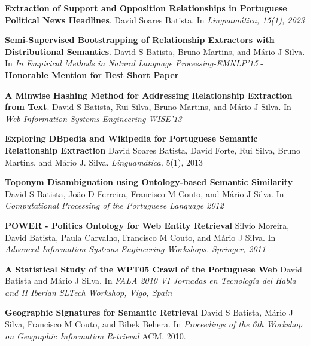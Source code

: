 
\vspace{-5.5mm}

\begin{cventries}

  \cventry
    {} %
    {} %
    {} %
    {} %
    {
      \begin{cvitems} %
        \item {\bf Extraction of Support and Opposition Relationships in Portuguese Political News Headlines}. David Soares Batista. In {\it Linguamática, 15(1), 2023}
		\vspace{2.0mm}
        \item {{\bf Semi-Supervised Bootstrapping of Relationship Extractors with Distributional Semantics}. David S Batista, Bruno Martins, and Mário J Silva. In {\it In Empirical Methods in Natural Language Processing-EMNLP'15} - {\bf Honorable Mention for Best Short Paper}}
		\vspace{2.0mm}
		\item {{\bf A Minwise Hashing Method for Addressing Relationship Extraction from Text}. David S Batista, Rui Silva, Bruno Martins, and Mário J Silva. In {\it Web Information Systems Engineering-WISE'13}}
		\vspace{2.0mm}
		\item {{\bf Exploring DBpedia and Wikipedia for Portuguese Semantic Relationship Extraction} David Soares Batista, David Forte, Rui Silva, Bruno Martins, and Mário J. Silva. {\it Linguamática,} 5(1), 2013}
		\vspace{2.0mm}
		\item {{\bf Toponym Disambiguation using Ontology-based Semantic Similarity} David S Batista, João D Ferreira, Francisco M Couto, and Mário J Silva. In {\it Computational Processing of the Portuguese Language 2012}}
		\vspace{2.0mm}
		\item {{\bf POWER - Politics Ontology for Web Entity Retrieval} Silvio Moreira, David Batista, Paula Carvalho, Francisco M Couto, and Mário J Silva. In {\it Advanced Information Systems Engineering Workshops. Springer, 2011}}
		\vspace{2.0mm}
		\item {{\bf A Statistical Study of the WPT05 Crawl of the Portuguese Web} David Batista and Mário J Silva. In {\it FALA 2010 VI Jornadas en Tecnología del Habla and II Iberian SLTech Workshop, Vigo, Spain}}
		\vspace{2.0mm}
		\item {{\bf Geographic Signatures for Semantic Retrieval} David S Batista, Mário J Silva, Francisco M Couto, and Bibek Behera. In {\it Proceedings of the 6th Workshop on Geographic Information Retrieval} ACM, 2010.}		
      \end{cvitems}
    }
\end{cventries}

